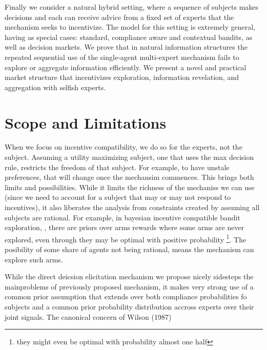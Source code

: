 Finally we consider a natural hybrid setting, where a sequence of subjects makes decisions and each can receive advice from a fixed set of experts that the mechanism seeks to incentivize.
The model for this setting is extremely general, having as special cases: standard, compliance aware and contextual bandits, as well as decision markets.
We prove that in natural information structures the repeated sequential use of the single-agent multi-expert mechanism fails to explore or aggregate information efficiently.
We present a novel and practical market structure that incentivizes exploration, information revelation, and aggregation with selfish experts.



\section{Scope and Limitations}

When we focus on incentive compatibility, we do so for the experts, not the subject. Assuming a  utility maximizing subject, one that uses the max decision rule, restricts the freedom of that subject. For example, to have unstale preferences, that will change once the mechansim commences. This brings both limits and possibilities. While it limits the richness of the mechaniss we can use (since we need to account for a subject that may or may not respond to incentives), it also liberates the analysis from constraints created by assuming all subjects are rational. For example, in bayesian incentive compatible bandit exploration, \cite{mansour2015bayesian}, there are priors over arms rewards where some arms are never explored, even through they may be optimal with positive probability \footnote{they might even be optimal with probability almost one half}. The posibility of some share of agents not being rational, means the mechanism can explore such arms.

While the direct deicsion elicitation mechanism we propose nicely sidesteps the mainproblems of previously proposed mechanism, it makes very strong use of a common prior assumption that extends over both compliance probabilities fo subjects and a common prior probability distribution accross experts over their joint signals. The canonical concern of Wilson (1987) 


